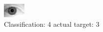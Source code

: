 \begin{figure}[h!]
\begin{center}
\includegraphics[width=0.60\columnwidth]{figures/ID2121_class_4_target_3.png}
\end{center}
\caption{ Classification: 4 actual target: 3}
\label{fig:ID2121_class_4_target_3}
\end{figure}
